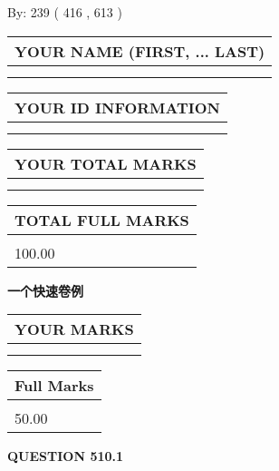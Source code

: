 \documentclass{ctexart}
\begin{document}
   
\hspace{1.0in} By: 
 239 ( 416 ,  613 )
   
   
   
   
\newpage 
\setcounter{page}{ 
   510001 } 
   
   
   
   
\noindent\begin{tabular}{|l|}
\hline
YOUR NAME (FIRST, ... LAST)  \\
\hline
 \\ 
 \\ 
\hline
\end{tabular}
\hspace{0.05in} \begin{tabular}{|l|}
\hline
 YOUR   ID   INFORMATION  \\
\hline
 \\ 
 \\ 
\hline
\end{tabular}
   
   
\vspace{0.2in}\noindent\begin{tabular}{|l|}
\hline
YOUR TOTAL MARKS  \\
\hline
 \\ 
 \\ 
\hline
\end{tabular}
\hspace{0.05in} \begin{tabular}{|l|}
\hline
TOTAL FULL MARKS  \\
\hline
 \\ 
100.00 \\
\hline
\end{tabular}
   
   
 \vspace{0.2in}
{\LARGE {\textbf{ 一个快速卷例}}}
   
   
  
\vspace{0.2in}
  
\noindent\begin{tabular}{|l|}
\hline
 YOUR MARKS  \\
\hline
 \\ 
 \\ 
\hline
\end{tabular}
\hspace{0.05in} \begin{tabular}{|l|}
\hline
 Full Marks  \\
\hline
 \\ 
50.00 \\
\hline
\end{tabular}
{\textbf{\Large{QUESTION
510.1 
}}}
  
\end{document}
